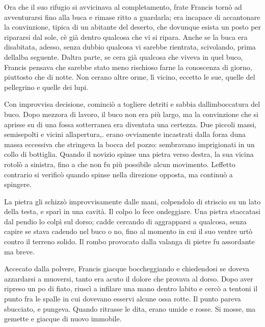 Ora che il suo rifugio si avvicinava al completamento, frate Francis
tornò ad avventurarsi fino alla buca e rimase ritto a guardarla; era
incapace di accantonare la convinzione, tipica di un abitante del
deserto, che dovunque esista un posto per ripararsi dal sole,
c\textquotesingle è già dentro qualcosa che vi si ripara. Anche se la
buca era disabitata, adesso, senza dubbio qualcosa vi sarebbe rientrata,
scivolando, prima dell\textquotesingle alba seguente.
D\textquotesingle altra parte, se c\textquotesingle era già qualcosa che
viveva in quel buco, Francis pensava che sarebbe stato meno rischioso
farne la conoscenza di giorno, piuttosto che di notte. Non
c\textquotesingle erano altre orme, lì vicino, eccetto le sue, quelle
del pellegrino e quelle dei lupi.

Con improvvisa decisione, cominciò a togliere detriti e sabbia
dall\textquotesingle imboccatura del buco. Dopo mezz\textquotesingle ora
di lavoro, il buco non era più largo, ma la convinzione che si aprisse
su di una fossa sotterranea era diventata una certezza. Due piccoli
massi, semisepolti e vicini all\textquotesingle apertura,. erano
ovviamente incastrati dalla forza d\textquotesingle una massa eccessiva
che stringeva la bocca del pozzo: sembravano imprigionati in un collo di
bottiglia. Quando il novizio spinse una pietra verso destra, la sua
vicina rotolò a sinistra, fino a che non fu più possibile alcun
movimento. L\textquotesingle effetto contrario si verificò quando spinse
nella direzione opposta, ma continuò a spingere.

La pietra gli schizzò improvvisamente dalle mani, colpendolo di striscio
su un lato della testa, e sparì in una cavità. Il colpo lo fece
ondeggiare. Una pietra staccatasi dal pendio lo colpì sul dorso; cadde
cercando di aggrapparsi a qualcosa, senza capire se stava cadendo nel
buco o no, fino al momento in cui il suo ventre urtò contro il terreno
solido. Il rombo provocato dalla valanga di pietre fu assordante ma
breve.

Accecato dalla polvere, Francis giacque boccheggiando e chiedendosi se
doveva azzardarsi a muoversi, tanto era acuto il dolore che provava al
dorso. Dopo aver ripreso un po\textquotesingle{} di fiato, riuscì a
infilare una mano dentro l\textquotesingle abito e cercò a tentoni il
punto fra le spalle in cui dovevano esservi alcune ossa rotte. Il punto
pareva sbucciato, e pungeva. Quando ritrasse le dita, erano umide e
rosse. Si mosse, ma gemette e giacque di nuovo immobile.

